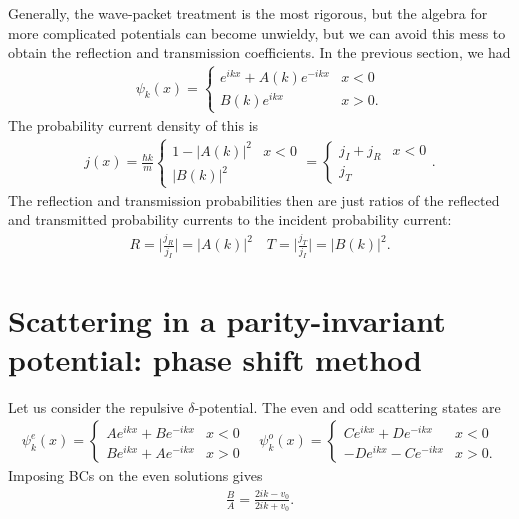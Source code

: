 Generally, the wave-packet treatment is the most rigorous, but the algebra for more complicated potentials can become unwieldy, but we can avoid this mess to obtain the reflection and transmission coefficients.
In the previous section, we had
\begin{eqnarray}
    \psi_{k}(x) = \begin{cases}
        e^{ikx} + A(k) e^{-ikx} & x < 0 \\
        B(k)e^{ikx} & x > 0
    .\end{cases}
\end{eqnarray}
The probability current density of this is
\begin{eqnarray}
    j(x) = \frac{\hbar k}{m} \begin{cases}
        1 - |A(k)|^2 & x < 0 \\
        |B(k)|^2
    \end{cases} = \begin{cases}
        j_{I} + j_{R} & x < 0 \\
        j_{T}
    \end{cases}
.\end{eqnarray}
The reflection and transmission probabilities then are just ratios of the reflected and transmitted probability currents to the incident probability current:
\begin{eqnarray}
    R = \Big| \frac{j_{R}}{j_{I}} \Big| = |A(k)|^2 \quad T = \Big| \frac{j_{T}}{j_{I}} \Big| = |B(k)|^2
.\end{eqnarray}


\section{Scattering in a parity-invariant potential: phase shift method}

Let us consider the repulsive $\delta$-potential.
The even and odd scattering states are
\begin{eqnarray}
    \psi_{k}^{e}(x) = \begin{cases}
        A e^{ikx} + B e^{-ikx} & x < 0 \\
        B e^{ikx} + A e^{-ikx} & x > 0
    \end{cases}
    \quad
    \psi_{k}^{o}(x) = \begin{cases}
        C e^{ikx} + D e^{-ikx} & x < 0 \\
        -D e^{ikx} - C e^{-ikx} & x > 0
    .\end{cases}
\end{eqnarray}
Imposing BCs on the even solutions gives
\begin{eqnarray}
    \frac{B}{A} = \frac{2ik - v_0}{2ik + v_0}
.\end{eqnarray}

